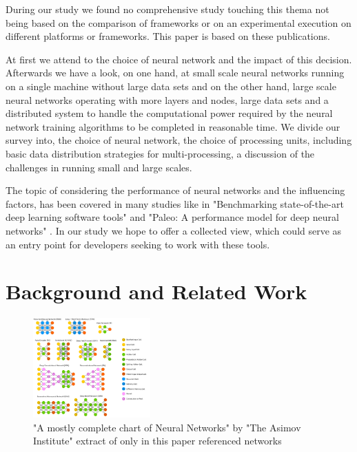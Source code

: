 \documentclass[conference]{IEEEtran}
\begin{document}
During our study we found no comprehensive study touching this thema not being based on the comparison of frameworks or on an experimental execution on different platforms or frameworks. This paper is based on these publications.

 At first we attend to the choice of neural network and the impact of this decision. Afterwards we have a look, on one hand, at small scale neural networks running on a single machine without large data sets and on the other hand, large scale neural networks operating with more layers and nodes, large data sets and a distributed system to handle the computational power required by the neural network training algorithms to be completed in reasonable time. We divide our survey into, the choice of neural network, the choice of processing units, including basic data distribution strategies for multi-processing, a discussion of the challenges in running small and large scales.



The topic of considering the performance of neural networks and the influencing factors, has been covered in many studies like
 in "Benchmarking state-of-the-art deep learning software tools" \cite{shi2016benchmarking} and "Paleo: A performance model for deep neural networks" \cite{qi2016paleo}. In our study we hope to offer a collected view, which could serve as an entry point for developers seeking to work with these tools.


\section{Background and Related Work}

\begin{figure}
\centering
\includegraphics[width=0.4\textwidth]{neuralnetworks.png}
\caption{"A mostly complete chart of Neural Networks" by "The Asimov Institute" extract of only in this paper referenced networks\cite{zoo}}
\end{figure}
\end{document}
